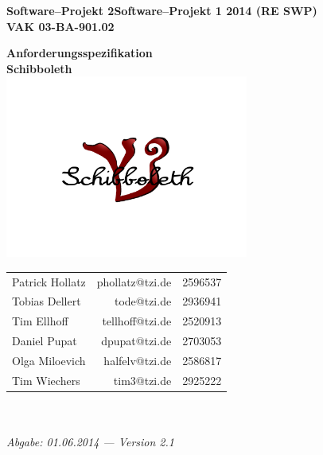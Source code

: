 \documentclass[fontsize=12pt,paper=a4,twoside]{scrartcl}
\newcommand{\swp}[0]{\ifthenelse{\boolean{langversion}}%
{Software--Projekt 2}{Software--Projekt 1}}
\newcommand{\jahr}[0]{2014 (RE SWP)}
\begin{document}
  \thispagestyle{fancy}
  \fancyhead[LO,RE]{ }
  \fancyfoot[C]{}

  \vspace{3cm}

  \begin{minipage}[H]{\textwidth}
  \begin{center}
  \bf
  \Large
  \swp{} \jahr\\
  \smallskip
  \small
  VAK 03-BA-901.02\\
  \vspace{3cm}
  \end{center}
  \end{minipage}
  \begin{minipage}[H]{\textwidth}
  \begin{center}
  \vspace{1cm}
  \bf
  {\Large Anforderungsspezifikation}\\
  \vspace{3ex}
  Schibboleth\\
  \includegraphics[width=0.6\textwidth]{Bilder/Logo.png}
  \vfill
  \end{center}
  \end{minipage}
  \vfill
  \begin{minipage}[H]{\textwidth}
  \begin{center}
  \sf
  \begin{tabular}{lrr}
  Patrick Hollatz & phollatz@tzi.de & 2596537 \\
  Tobias Dellert & tode@tzi.de & 2936941 \\
  Tim Ellhoff & tellhoff@tzi.de & 2520913\\
  Daniel Pupat & dpupat@tzi.de & 2703053 \\
  Olga Miloevich & halfelv@tzi.de  & 2586817\\  
  Tim Wiechers & tim3@tzi.de & 2925222 \\
  \end{tabular}
  \\ ~
  \vspace{2cm}
  \\
  \it Abgabe: 01.06.2014 --- Version 2.1\\ ~
  \end{center}
  \end{minipage}
\end{document}
